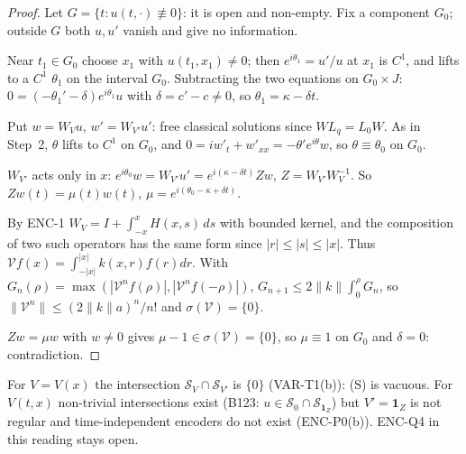 \begin{proof}
Let $G=\{t:u(t,\cdot)\not\equiv0\}$: it is open and non-empty. Fix a component $G_0$; outside $G$ both $u,u'$ vanish and give no information.

Near $t_1\in G_0$ choose $x_1$ with $u(t_1,x_1)\ne0$; then $e^{i\theta_1}=u'/u$ at $x_1$ is $C^1$, and lifts to a $C^1$ $\theta_1$ on the interval $G_0$. Subtracting the two equations on $G_0\times J$: $0=(-\theta_1'-\delta)e^{i\theta_1}u$ with $\delta=c'-c\ne0$, so $\theta_1=\kappa-\delta t$.

Put $w=W_Vu$, $w'=W_{V'}u'$: free classical solutions since $WL_q=L_0W$. As in Step~2, $\theta$ lifts to $C^1$ on $G_0$, and $0=iw'_t+w'_{xx}=-\theta'e^{i\theta}w$, so $\theta\equiv\theta_0$ on $G_0$.

$W_{V'}$ acts only in $x$: $e^{i\theta_0}w=W_{V'}u'=e^{i(\kappa-\delta t)}Zw$, $Z=W_{V'}W_V^{-1}$. So $Zw(t)=\mu(t)w(t)$, $\mu=e^{i(\theta_0-\kappa+\delta t)}$.

By ENC-1 $W_V=I+\int_{-x}^{x}H(x,s)\,ds$ with bounded kernel, and the composition of two such operators has the same form since $|r|\le|s|\le|x|$. Thus $\mathcal Vf(x)=\int_{-|x|}^{|x|}k(x,r)f(r)dr$. With $G_n(\rho)=\max(|\mathcal V^nf(\rho)|,|\mathcal V^nf(-\rho)|)$, $G_{n+1}\le2\|k\|\int_0^\rho G_n$, so $\|\mathcal V^n\|\le(2\|k\|a)^n/n!$ and $\sigma(\mathcal V)=\{0\}$.

$Zw=\mu w$ with $w\ne0$ gives $\mu-1\in\sigma(\mathcal V)=\{0\}$, so $\mu\equiv1$ on $G_0$ and $\delta=0$: contradiction.

\end{proof}

\begin{caution}[title=Literal DM3 reading]
For $V=V(x)$ the intersection $\mathcal S_V\cap\mathcal S_{V'}$ is $\{0\}$ (VAR-T1(b)): (S) is vacuous. For $V(t,x)$ non-trivial intersections exist (B123: $u\in\mathcal S_0\cap\mathcal S_{\mathbf 1_Z}$) but $V'=\mathbf 1_Z$ is not regular and time-independent encoders do not exist (ENC-P0(b)). ENC-Q4 in this reading stays open.
\end{caution}

